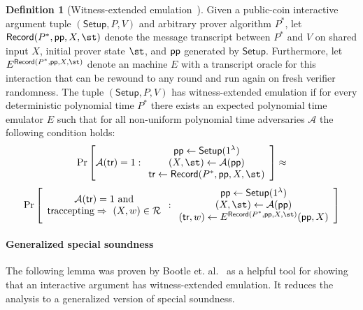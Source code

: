 \documentclass{article}
\theoremstyle{definition}
\newtheorem{definition}{Definition}
\newcommand{\alaninline}[1]{{\todo[color=blue!20!white, inline]{Alan: #1}}}
\newcommand{\alaninline}[1]{}
\begin{document}
\begin{definition}[Witness-extended emulation~\cite{EC:GroIsh08}]\label{def:wee}
Given a public-coin interactive argument tuple $(\textsf{Setup}, P, V)$ and arbitrary prover algorithm $P^*$, let $\textsf{Record}(P^*, \params, X, \st)$ denote the message transcript between $P^*$ and $V$ on shared input $X$, initial prover state $\st$, and $\textsf{pp}$ generated by $\textsf{Setup}$. Furthermore, let $E^{\textsf{Record}(P^*, \params, X, \st)}$ denote an machine $E$ with a transcript oracle for this interaction that can be rewound to any round and run again on fresh verifier randomness. The tuple $(\textsf{Setup}, P, V)$ has witness-extended emulation if for every deterministic polynomial time $P^*$ there exists an expected polynomial time emulator $E$ such that for all non-uniform polynomial time adversaries $\mathcal{A}$ the following condition holds: 
\[
\Pr \left[
\mathcal{A}(\textsf{tr}) = 1
:
\begin{array}{c}
             \params \leftarrow \textsf{Setup}(1^\lambda) \\
             (X, \st) \leftarrow \mathcal{A}(\params) \\
             \tr \leftarrow \textsf{Record}(P^*, \params, X, \st)
\end{array} 
\right] \approx
\]
\[
\Pr \left[
\begin{array}{c} 
\mathcal{A}(\textsf{tr}) = 1 \ \text{and} \\ 
\text{\tr accepting} \Rightarrow \ (X, w) \in \mathcal{R}
\end{array} 
:
\begin{array}{c}
             \params \leftarrow \textsf{Setup}(1^\lambda) \\
             (X, \st) \leftarrow \mathcal{A}(\params) \\
(\textsf{tr}, w) \leftarrow E^{\textsf{Record}(P^*, \params, X, \st)}(\params, X)
\end{array}
\right]
\]

\end{definition}


\paragraph{Generalized special soundness} The following lemma was proven by Bootle et. al.~\cite{EC:BCCGP16} as a helpful tool for showing that an interactive argument has witness-extended emulation. It reduces the analysis to a generalized version of special soundness. 
\end{document}
